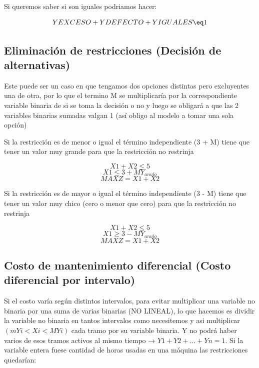 \documentclass[titlepage,a4paper]{article}
\begin{document}
Si queremos saber si son iguales podriamos hacer:

$$ YEXCESO + YDEFECTO + YIGUALES \eq 1 $$



\vspace{0.5cm}

\subsection{Eliminación de restricciones (Decisión de alternativas)}

Este puede ser un caso en que tengamos dos opciones distintas pero excluyentes una de otra, por lo que el termino M se multiplicaría por la correspondiente variable binaria de si se toma la decisión o no y luego se obligará a que las 2 variables binarias sumadas valgan 1 (así obligo al modelo a tomar una sola opción)

\vspace{0.5cm}

Si la restricción es de menor o igual el término independiente (3 + M) tiene que tener un valor muy grande para que la restricción no restrinja

$$ X1 + X2 \leq 5 $$
$$ X1 \leq 3 + M Y_{anulo} $$
$$ MAX Z = X1 + X2 $$

\vspace{0.5cm}

Si la restricción es de mayor o igual el término independiente (3 - M) tiene que tener un valor muy chico (cero o menor que cero) para que la restricción no restrinja

$$ X1 + X2 \leq 5 $$
$$ X1 \geq 3 - M Y_{anulo} $$
$$ MAX Z = X1 + X2 $$

\vspace{0.5cm}

\subsection{Costo de mantenimiento diferencial (Costo diferencial por intervalo)}

Si el costo varía según distintos intervalos, para evitar multiplicar una variable no binaria por una suma de varias binarias (NO LINEAL),
lo que hacemos es dividir la variable no binaria en tantos intervalos como necesitemos y asi multiplicar $(m Yi < Xi < M Yi)$ cada tramo por su variable binaria. Y no podrá haber varios de esos tramos activos al mismo tiempo → $Y1 + Y2 + ... + Yn = 1$.
Si la variable entera fuese cantidad de horas usadas en una máquina las restricciones quedarían:
\end{document}
